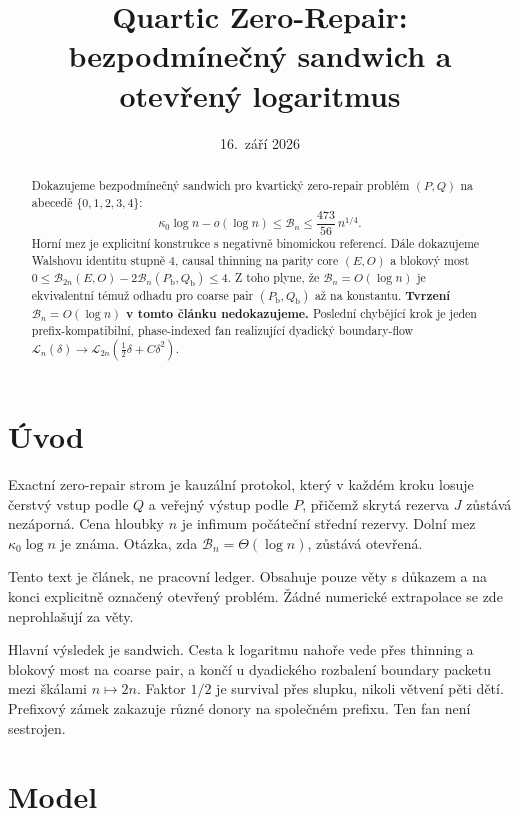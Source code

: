 \documentclass[11pt,a4paper]{article}
\title{Quartic Zero-Repair:\\bezpodmínečný sandwich a otevřený logaritmus}
\author{}
\date{16.~září 2026}
\theoremstyle{definition}
\theoremstyle{remark}
\theoremstyle{plain}
\begin{document}
\maketitle

\begin{abstract}
Dokazujeme bezpodmínečný sandwich pro kvartický zero-repair problém
$(P,Q)$ na abecedě $\{0,1,2,3,4\}$:
\[
\kappa_0\log n-o(\log n)
\le\mathcal B_n
\le\frac{473}{56}\,n^{1/4}.
\]
Horní mez je explicitní konstrukce s negativně binomickou referencí.
Dále dokazujeme Walshovu identitu stupně $4$, causal thinning na parity
core $(E,O)$ a blokový most
$0\le\mathcal B_{2n}(E,O)-2\mathcal B_n(P_{\mathrm b},Q_{\mathrm b})\le 4$.
Z toho plyne, že $\mathcal B_n=O(\log n)$ je ekvivalentní témuž odhadu
pro coarse pair $(P_{\mathrm b},Q_{\mathrm b})$ až na konstantu.
\textbf{Tvrzení $\mathcal B_n=O(\log n)$ v tomto článku nedokazujeme.}
Poslední chybějící krok je jeden prefix-kompatibilní, phase-indexed fan
realizující dyadický boundary-flow
$\mathcal L_n(\delta)\to\mathcal L_{2n}(\frac12\delta+C\delta^2)$.
\end{abstract}

\tableofcontents
\newpage

\section{Úvod}

Exactní zero-repair strom je kauzální protokol, který v každém kroku
losuje čerstvý vstup podle $Q$ a veřejný výstup podle $P$, přičemž
skrytá rezerva $J$ zůstává nezáporná. Cena hloubky $n$ je infimum
počáteční střední rezervy. Dolní mez $\kappa_0\log n$ je známa.
Otázka, zda $\mathcal B_n=\Theta(\log n)$, zůstává otevřená.

Tento text je článek, ne pracovní ledger. Obsahuje pouze věty s důkazem
a na konci explicitně označený otevřený problém. Žádné numerické
extrapolace se zde neprohlašují za věty.

Hlavní výsledek je sandwich. Cesta k logaritmu nahoře vede přes thinning
a blokový most na coarse pair, a končí u dyadického rozbalení boundary
packetu mezi škálami $n\mapsto 2n$. Faktor $1/2$ je survival přes slupku,
nikoli větvení pěti dětí. Prefixový zámek zakazuje různé donory na
společném prefixu. Ten fan není sestrojen.

\section{Model}
\end{document}
